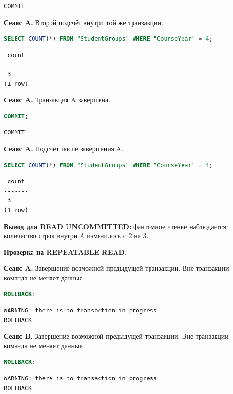 \documentclass[12pt,a4paper]{article}
\begin{document}
\begin{lstlisting}
COMMIT
\end{lstlisting}

\textbf{Сеанс A.} Второй подсчёт внутри той же транзакции.
\begin{lstlisting}[language=SQL]
SELECT COUNT(*) FROM "StudentGroups" WHERE "CourseYear" = 4;
\end{lstlisting}

\begin{lstlisting}
 count
-------
 3
(1 row)
\end{lstlisting}

\textbf{Сеанс A.} Транзакция A завершена.
\begin{lstlisting}[language=SQL]
COMMIT;
\end{lstlisting}

\begin{lstlisting}
COMMIT
\end{lstlisting}

\textbf{Сеанс A.} Подсчёт после завершения A.
\begin{lstlisting}[language=SQL]
SELECT COUNT(*) FROM "StudentGroups" WHERE "CourseYear" = 4;
\end{lstlisting}

\begin{lstlisting}
 count
-------
 3
(1 row)
\end{lstlisting}

\textbf{Вывод для READ UNCOMMITTED:} фантомное чтение наблюдается: количество строк внутри A изменилось с 2 на 3.

\textbf{Проверка на REPEATABLE READ.}

\textbf{Сеанс A.} Завершение возможной предыдущей транзакции. Вне транзакции команда не меняет данные.
\begin{lstlisting}[language=SQL]
ROLLBACK;
\end{lstlisting}

\begin{lstlisting}
WARNING: there is no transaction in progress
ROLLBACK
\end{lstlisting}

\textbf{Сеанс B.} Завершение возможной предыдущей транзакции. Вне транзакции команда не меняет данные.
\begin{lstlisting}[language=SQL]
ROLLBACK;
\end{lstlisting}

\begin{lstlisting}
WARNING: there is no transaction in progress
ROLLBACK
\end{lstlisting}
\end{document}
